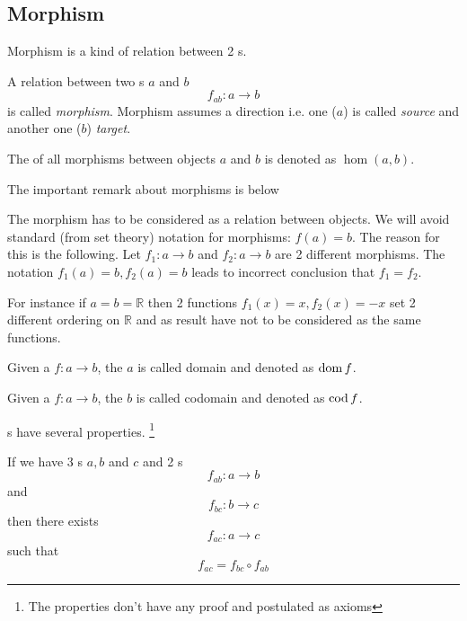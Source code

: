 \subsection{Morphism}
Morphism is a kind of relation between 2 s. 
\begin{definition}[Morphism]
  \label{def:morphism}
  A relation between two s $a$ and $b$ 
  \[
  f_{ab}: a \rightarrow b
  \]
  is called
  \textit{morphism}. Morphism assumes a direction i.e. one 
  ($a$) is called \textit{source} and another one ($b$)
  \textit{target}.

  The  of all morphisms between objects $a$ and $b$
  is denoted as $\hom\left(a, b\right)$.
\end{definition}

The important remark about morphisms is below
\begin{remark}[Morphism]
\label{rem:morphism}
The morphism has to be considered as a relation between objects. We
will avoid standard (from set theory) notation for morphisms: $f(a) =
b$. The reason for this is the following. Let $f_1: a \to b$ and $f_2:
a \to b$ are 2 different morphisms. The notation $f_1(a) = b, f_2(a) =
b$ leads to incorrect conclusion that $f_1 = f_2$. 

For instance if $a
= b = \mathbb{R}$ then 2 functions $f_1(x) = x, f_2(x) = -x$ set 2
different ordering on $\mathbb{R}$ and as result have not to be
considered as the same functions.
\end{remark}

\begin{definition}[Domain]
  \label{def:domain}
  Given a  $f: a \to b$, the
   $a$ is called domain and denoted as $\operatorname{dom} f$.
\end{definition}

\begin{definition}[Codomain]
  \label{def:codomain}
  Given a  $f: a \to b$, the
   $b$ is called codomain and denoted as $\operatorname{cod} f$.
\end{definition}

s have several properties. \footnote{The
  properties don't have any proof and postulated as axioms}
\begin{axiom}[Composition]
  \label{axm:composition}
  If we have 3 s $a, b$ and $c$ and 2
  s 
  \[
  f_{ab} : a \rightarrow b
  \]
  and 
  \[
  f_{bc} : b \rightarrow c
  \]
  then there exists  
  \[
  f_{ac} : a \rightarrow c
  \]
  such that
  \[
  f_{ac} = f_{bc} \circ f_{ab}
  \]
\end{axiom}

